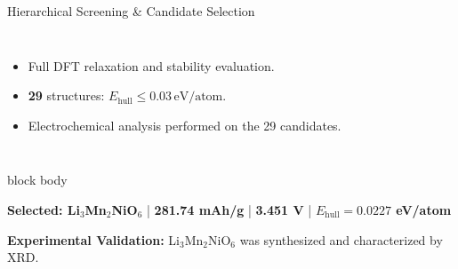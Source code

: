 \documentclass[aspectratio=169, 11pt]{beamer}
\begin{document}
\begin{frame}{Hierarchical Screening \& Candidate Selection}
\begin{columns}[T]
        \vspace{0.01cm}

        {\footnotesize
        \begin{itemize}
            \setlength{\itemsep}{1pt}

            \item Full DFT relaxation and
            stability evaluation.

            \item \textbf{29} structures:
            $E_{\mathrm{hull}}\leq0.03\,\mathrm{eV/atom}$.

            \item Electrochemical analysis
            performed on the 29 candidates.
        \end{itemize}
        }

    \end{columns}

    \vspace{0.02cm}

    \begin{beamercolorbox}[
        rounded=true,
        sep=3pt
    ]{block body}

        \centering
        \small
        \textbf{Selected: Li$_3$Mn$_2$NiO$_6$}
        \quad|\quad
        \textbf{281.74 mAh/g}
        \quad|\quad
        \textbf{3.451 V}
        \quad|\quad
        \textbf{$E_{\mathrm{hull}}=0.0227$ eV/atom}

    \end{beamercolorbox}

    \vspace{0.03cm}

    \centering
    \scriptsize
    \textbf{Experimental Validation:}
    Li$_3$Mn$_2$NiO$_6$ was synthesized and characterized by XRD.

\end{frame}
\end{document}
